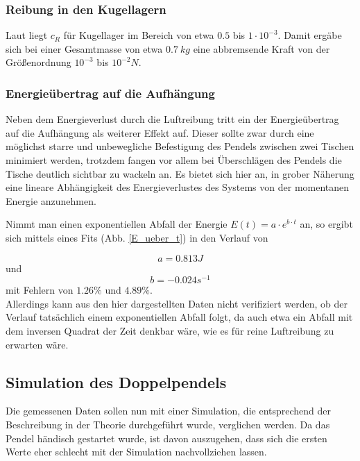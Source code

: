 \subsubsection{Reibung in den Kugellagern}
Laut \cite{wiki} liegt $ c_R $ für Kugellager im Bereich von etwa 
$ 0.5 $ bis $ 1 \cdot 10^{-3} $. 
Damit ergäbe sich bei einer Gesamtmasse von etwa $ 0.7 \  kg  $ eine abbremsende Kraft von der Größenordnung $ 10^{-3} $ bis $ 10^{-2} N $. 

\subsubsection{Energieübertrag auf die Aufhängung}
Neben dem Energieverlust durch die Luftreibung tritt ein der Energieübertrag auf die Aufhängung als weiterer Effekt auf. Dieser sollte zwar durch eine möglichst starre und unbewegliche Befestigung des Pendels zwischen zwei Tischen minimiert werden, trotzdem fangen vor allem bei Überschlägen des Pendels die Tische deutlich sichtbar zu wackeln an. 
Es bietet sich hier an, in grober Näherung eine lineare Abhängigkeit des Energieverlustes des Systems von der momentanen Energie anzunehmen. 

Nimmt man einen exponentiellen Abfall der Energie $ E(t) = a \cdot e^{b \cdot t} $ an, so ergibt sich mittels eines Fits (Abb. \ref{E_ueber_t}) in den Verlauf von 

\begin{equation}
 a = 0.813   J
\nonumber
\end{equation}  und  
\begin{equation}
b = -0.024  s^{-1}
\nonumber
\end{equation} 
mit Fehlern von $1.26 \% $ und $ 4.89 \% $. \\
Allerdings kann aus den hier dargestellten Daten nicht verifiziert werden, ob der Verlauf tatsächlich einem exponentiellen Abfall folgt, da auch etwa ein Abfall mit dem inversen Quadrat der Zeit denkbar wäre, wie es für reine Luftreibung zu erwarten wäre. 

\subsection{Simulation des Doppelpendels}
Die gemessenen Daten sollen nun mit einer Simulation, die entsprechend der Beschreibung in der Theorie durchgeführt wurde, verglichen werden. Da das Pendel händisch gestartet wurde, ist davon auszugehen, dass sich die ersten Werte eher schlecht mit der Simulation nachvollziehen lassen. 


